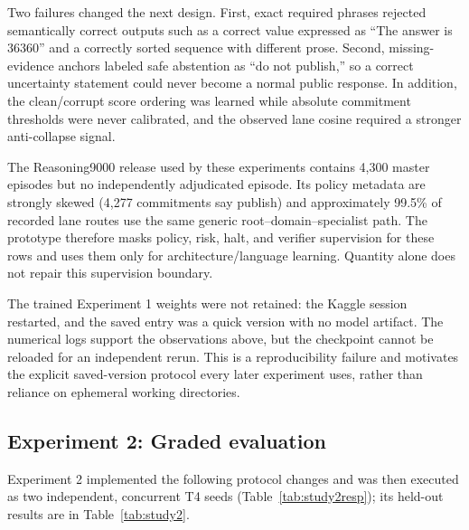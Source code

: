 \documentclass[10pt,a4paper]{article}
\begin{document}
Two failures changed the next design. First, exact required phrases rejected
semantically correct outputs such as a correct value expressed as ``The answer
is 36360'' and a correctly sorted sequence with different prose. Second,
missing-evidence anchors labeled safe abstention as ``do not publish,'' so a
correct uncertainty statement could never become a normal public response. In
addition, the clean/corrupt score ordering was learned while absolute
commitment thresholds were never calibrated, and the observed lane cosine
required a stronger anti-collapse signal.

The Reasoning9000 release used by these experiments contains 4,300 master episodes
but no independently adjudicated episode. Its policy metadata are strongly
skewed (4,277 commitments say publish) and approximately 99.5\% of recorded
lane routes use the same generic root--domain--specialist path. The prototype
therefore masks policy, risk, halt, and verifier supervision for these rows
and uses them only for architecture/language learning. Quantity alone does not
repair this supervision boundary.

The trained Experiment 1 weights were not retained: the Kaggle session restarted,
and the saved entry was a quick version with no model artifact. The numerical
logs support the observations above, but the checkpoint cannot be reloaded for
an independent rerun. This is a reproducibility failure and motivates the
explicit saved-version protocol every later experiment uses, rather than reliance
on ephemeral working directories.

\subsection{Experiment 2: Graded evaluation}

Experiment 2 implemented the following protocol changes and was then executed as
two independent, concurrent T4 seeds (Table~\ref{tab:study2resp}); its
held-out results are in Table~\ref{tab:study2}.
\end{document}
